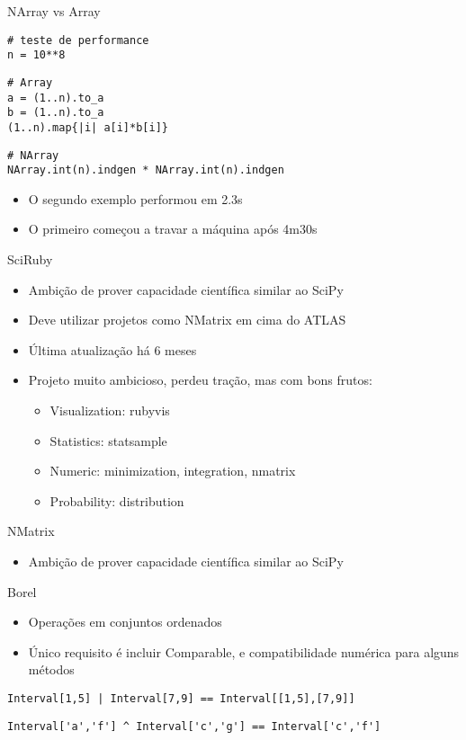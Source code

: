 \documentclass{beamer}
\begin{document}
  \begin{frame}[fragile]{NArray vs Array}
    \begin{verbatim}
# teste de performance
n = 10**8
    \end{verbatim}
    \pause
    \begin{verbatim}
# Array
a = (1..n).to_a
b = (1..n).to_a
(1..n).map{|i| a[i]*b[i]}
    \end{verbatim}
    \pause
    \begin{verbatim}
# NArray
NArray.int(n).indgen * NArray.int(n).indgen
    \end{verbatim}
    \pause
    \begin{itemize}
      \item O segundo exemplo performou em 2.3s \pause
      \item O primeiro começou a travar a máquina após 4m30s
    \end{itemize}
\end{frame}
  \begin{frame}{SciRuby}
    \begin{itemize}
      \item Ambição de prover capacidade científica similar ao SciPy \pause
      \item Deve utilizar projetos como NMatrix em cima do ATLAS \pause
      \item Última atualização há 6 meses \pause
      \item Projeto muito ambicioso, perdeu tração, mas com bons frutos: \pause
      \begin{itemize}
        \item Visualization: rubyvis \pause
        \item Statistics: statsample \pause
        \item Numeric: minimization, integration, nmatrix \pause
        \item Probability: distribution
      \end{itemize}
    \end{itemize}
  \end{frame}
  \begin{frame}{NMatrix}
    \begin{itemize}
      \item Ambição de prover capacidade científica similar ao SciPy \pause
    \end{itemize}
  \end{frame}
  \begin{frame}[fragile]{Borel}
    \begin{itemize}
      \item Operações em conjuntos ordenados \pause
      \item Único requisito é incluir Comparable, e compatibilidade numérica para alguns métodos \pause
    \end{itemize}
    \pause
    \begin{verbatim}
Interval[1,5] | Interval[7,9] == Interval[[1,5],[7,9]]
    \end{verbatim}
    \pause
    \begin{verbatim}
Interval['a','f'] ^ Interval['c','g'] == Interval['c','f']
    \end{verbatim}
\end{frame}
  \begin{frame}[plain]
    \titlepage
  \end{frame}
\end{document}
